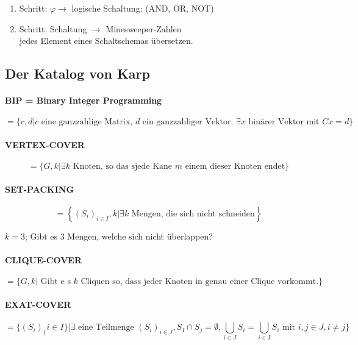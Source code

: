 \begin{enumerate}
\item Schritt: $\varphi \longrightarrow$ logische Schaltung: (AND, OR, NOT)
\item Schritt: Schaltung $\rightarrow$ Minesweeper-Zahlen \\
	jedes Element eines Schaltschemas übersetzen.
\end{enumerate}

\subsection{Der Katalog von Karp}



\paragraph{BIP = Binary Integer Programming} \[
	= \{c,d | c \text{ eine ganzzahlige Matrix, } d \text{ ein ganzzahliger Vektor. } \exists x \text{ binärer Vektor mit } Cx=d \}
\]

\paragraph{VERTEX-COVER} \[
	= \{ G, k | \exists k \text{ Knoten, so das sjede Kane } m \text{ einem dieser Knoten endet} \}
\]


\paragraph{SET-PACKING} \[
	= \left\{ (S_i)_{i \in I}, k | \exists k \text{ Mengen, die sich nicht schneiden} \right\}
\]

$k=3$; Gibt es 3 Mengen, welche sich nicht überlappen?

\paragraph{CLIQUE-COVER} \[
	= \{G,k| \text{ Gibt e s } k \text{ Cliquen so, dass jeder Knoten in genau einer Clique vorkommt.}\}
\]

\paragraph{EXAT-COVER} \[
	= \{ (S_i)_\{i \in I\} | \exists \text{ eine Teilmenge } (S_i)_{i \in J}, S_I \cap S_j = \emptyset, \bigcup_{i \in J} S_i = \bigcup_{i \in I} S_i \text{ mit } i,j \in J, i \neq j \}
\]

